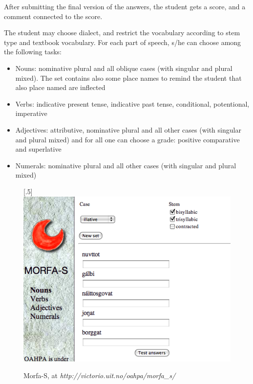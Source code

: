 \documentclass[a4paper,12pt]{article}
\begin{document}
After submitting the final version of the answers, the student gets a score, and a comment connected to the score.

The student may choose dialect, and restrict the vocabulary according to stem type and textbook vocabulary. For each part of speech, s/he can choose among the following tasks:
\begin{itemize}
\item Nouns: nominative plural and all oblique cases (with singular and plural mixed). The set contains also some place names to remind the student that also place named are inflected
\item Verbs: indicative present tense, indicative past tense, conditional, potentional, imperative
\item Adjectives: attributive, nominative plural and all other cases (with singular and plural mixed) and for all one can choose a grade: positive comparative and superlative
\item Numerals: nominative plural and all other cases (with singular and plural mixed)
\end{itemize}
\vspace{0.5cm}


\begin{figure}[htbp]
\begin{center}
\scalebox{.5}[.5]{\includegraphics{presentation/img/morfaS.png}}\\
\caption{Morfa-S, at \textit{http://victorio.uit.no/oahpa/morfa\_s/}}
\label{morfas}
\end{center}
\end{figure}
\end{document}
